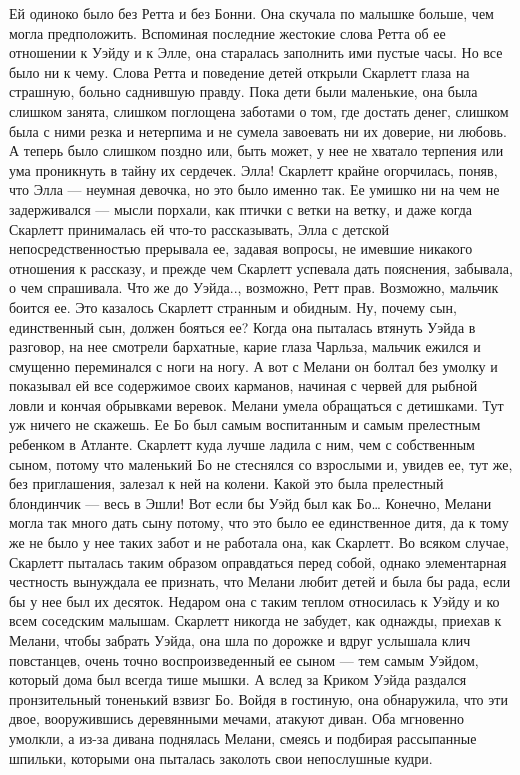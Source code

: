 Ей одиноко было без Ретта и без Бонни. Она скучала по малышке больше, чем могла предположить. Вспоминая последние жестокие слова Ретта об ее отношении к Уэйду и к Элле, она старалась заполнить ими пустые часы. Но все было ни к чему. Слова Ретта и поведение детей открыли Скарлетт глаза на страшную, больно саднившую правду. Пока дети были маленькие, она была слишком занята, слишком поглощена заботами о том, где достать денег, слишком была с ними резка и нетерпима и не сумела завоевать ни их доверие, ни любовь. А теперь было слишком поздно или, быть может, у нее не хватало терпения или ума проникнуть в тайну их сердечек.
Элла! Скарлетт крайне огорчилась, поняв, что Элла — неумная девочка, но это было именно так. Ее умишко ни на чем не задерживался — мысли порхали, как птички с ветки на ветку, и даже когда Скарлетт принималась ей что-то рассказывать, Элла с детской непосредственностью прерывала ее, задавая вопросы, не имевшие никакого отношения к рассказу, и прежде чем Скарлетт успевала дать пояснения, забывала, о чем спрашивала. Что же до Уэйда.., возможно, Ретт прав. Возможно, мальчик боится ее.
Это казалось Скарлетт странным и обидным. Ну, почему сын, единственный сын, должен бояться ее? Когда она пыталась втянуть Уэйда в разговор, на нее смотрели бархатные, карие глаза Чарльза, мальчик ежился и смущенно переминался с ноги на ногу. А вот с Мелани он болтал без умолку и показывал ей все содержимое своих карманов, начиная с червей для рыбной ловли и кончая обрывками веревок.
Мелани умела обращаться с детишками. Тут уж ничего не скажешь. Ее Бо был самым воспитанным и самым прелестным ребенком в Атланте. Скарлетт куда лучше ладила с ним, чем с собственным сыном, потому что маленький Бо не стеснялся со взрослыми и, увидев ее, тут же, без приглашения, залезал к ней на колени. Какой это была прелестный блондинчик — весь в Эшли! Вот если бы Уэйд был как Бо… Конечно, Мелани могла так много дать сыну потому, что это было ее единственное дитя, да к тому же не было у нее таких забот и не работала она, как Скарлетт. Во всяком случае, Скарлетт пыталась таким образом оправдаться перед собой, однако элементарная честность вынуждала ее признать, что Мелани любит детей и была бы рада, если бы у нее был их десяток. Недаром она с таким теплом относилась к Уэйду и ко всем соседским малышам.
Скарлетт никогда не забудет, как однажды, приехав к Мелани, чтобы забрать Уэйда, она шла по дорожке и вдруг услышала клич повстанцев, очень точно воспроизведенный ее сыном — тем самым Уэйдом, который дома был всегда тише мышки. А вслед за Криком Уэйда раздался пронзительный тоненький взвизг Бо. Войдя в гостиную, она обнаружила, что эти двое, вооружившись деревянными мечами, атакуют диван. Оба мгновенно умолкли, а из-за дивана поднялась Мелани, смеясь и подбирая рассыпанные шпильки, которыми она пыталась заколоть свои непослушные кудри.

